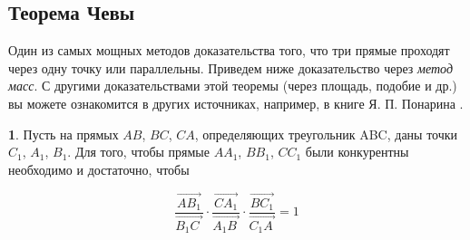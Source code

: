 \documentclass[14pt]{extarticle}
\let\Overrightarrow\overrightarrow
\theoremstyle{definition}
\theoremstyle{theorem}
\newenvironment{namedtheorem}[2]
{
\newcommand{\foo}{#1}
\newtheorem*{\foo{}}{\normalfont\fontsize{15}{15}{Теорема #2}}
\begin{\foo{}}
}
{\end{\foo{}}}
\begin{document}
\subsection{Теорема Чевы} 

\indent Один из самых мощных методов доказательства того, что три прямые 
проходят через одну точку или параллельны. 
Приведем ниже доказательство через \textit{метод масс}.
С другими доказательствами этой теоремы (через площадь, подобие и др.) 
вы можете ознакомится в других источниках, например, в книге Я. П. Понарина
.\\


\begin{namedtheorem}{ceva}{Чевы}
	Пусть на прямых $AB$, $BC$, $CA$, определяющих
    треугольник ABC, даны точки $C_1$, $A_1$, $B_1$. Для того, чтобы прямые
    $AA_1$, $BB_1$, $CC_1$ были конкурентны
    необходимо и достаточно, чтобы
	
	\begin{ceqn}
	\[
    \dfrac{\Overrightarrow{AB_1}}{\Overrightarrow{B_1C_{\, \,}}} \cdot 
	\dfrac{\Overrightarrow{CA_1}}
	{\Overrightarrow{A_1B_{\:}}} \cdot \dfrac{\Overrightarrow{BC_1}}
	{\Overrightarrow{C_1A_{\,}}} = 1
	\]
    \end{ceqn}

\end{namedtheorem}


\begin{figure}
	\hspace{-0.3cm}
	\vspace{-2cm}
\end{figure}
\end{document}
